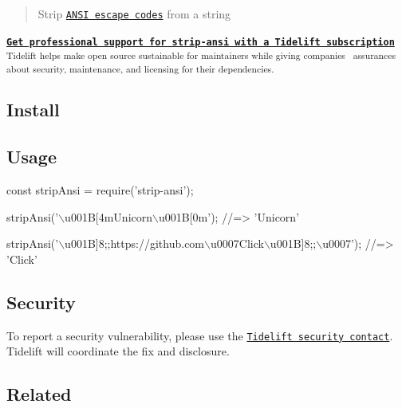 \begin{quote}
Strip \href{https://en.wikipedia.org/wiki/ANSI_escape_code}{\tt A\+N\+SI escape codes} from a string \end{quote}




 {\bfseries  \href{https://tidelift.com/subscription/pkg/npm-strip-ansi?utm_source=npm-strip-ansi&utm_medium=referral&utm_campaign=readme}{\tt Get professional support for \textquotesingle{}strip-\/ansi\textquotesingle{} with a Tidelift subscription} } ~\newline
 \textsubscript{ Tidelift helps make open source sustainable for maintainers while giving companies~\newline
assurances about security, maintenance, and licensing for their dependencies. }  



\subsection*{Install}




\subsection*{Usage}


\begin{DoxyCode}
const stripAnsi = require('strip-ansi');

stripAnsi('\(\backslash\)u001B[4mUnicorn\(\backslash\)u001B[0m');
//=> 'Unicorn'

stripAnsi('\(\backslash\)u001B]8;;https://github.com\(\backslash\)u0007Click\(\backslash\)u001B]8;;\(\backslash\)u0007');
//=> 'Click'
\end{DoxyCode}


\subsection*{Security}

To report a security vulnerability, please use the \href{https://tidelift.com/security}{\tt Tidelift security contact}. Tidelift will coordinate the fix and disclosure.

\subsection*{Related}


